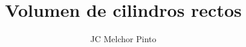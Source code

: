 \documentclass[12pt,addpoints,answers]{guia}
\title{Volumen de cilindros rectos}
\author{JC Melchor Pinto}
\begin{document}
\INFO
\begin{multicols}{2}
    
    
    
\end{multicols}
\begin{questions}
    \questionboxed[10]{}
    \questionboxed[10]{}
    \ejemplosboxed[]
    \questionboxed[10]{}
    \questionboxed[10]{}
    \ejemplosboxed[]
    \questionboxed[10]{}
    \questionboxed[10]{}
    \ejemplosboxed[]
    \questionboxed[10]{}
    \questionboxed[10]{}
    \ejemplosboxed[]
    \questionboxed[10]{}
    \questionboxed[10]{}
\end{questions}

\end{document}
